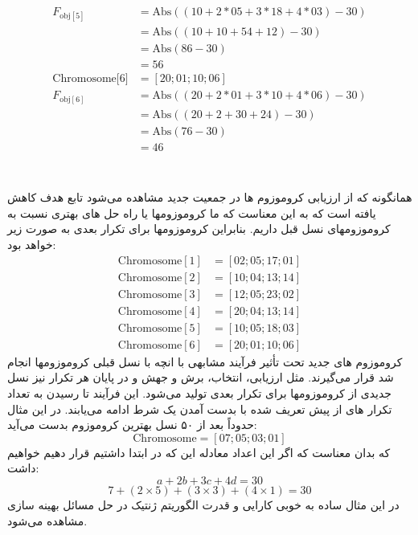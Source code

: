 \documentclass[11pt]{article}
\begin{document}
\[\begin{array}{ll}
F_{\text{obj}[5]} & = \text{Abs}\left((10 + 2*05 + 3*18 + 4*03) - 30\right) \\
& = \text{Abs}\left((10 + 10 + 54 + 12) - 30\right) \\
& = \text{Abs}(86 - 30) \\
& = 56 \\
\text{Chromosome[6]} & = [20;01;10;06] \\
F_{\text{obj}[6]} & = \text{Abs}\left((20 + 2*01 + 3*10 + 4*06) - 30\right) \\
& = \text{Abs}\left((20 + 2 + 30 + 24) - 30\right) \\
& = \text{Abs}(76 - 30) \\
& = 46 \\
\end{array}
\]
\\
\\

همانگونه که از ارزیابی کروموزوم ها در جمعیت جدید مشاهده می‌شود تابع هدف کاهش یافته است که به این معناست که ما کروموزومها یا راه حل های بهتری نسبت به کروموزومهای نسل قبل داریم. بنابراین کروموزومها برای تکرار بعدی به صورت زیر خواهد بود:
\[
\begin{array}{ll}
\text{Chromosome}[1] & = [02;05;17;01] \\
\text{Chromosome}[2] & = [10;04;13;14] \\
\text{Chromosome}[3] & = [12;05;23;02] \\
\text{Chromosome}[4] & = [20;04;13;14] \\
\text{Chromosome}[5] & = [10;05;18;03] \\
\text{Chromosome}[6] & = [20;01;10;06]
\end{array}
\]
کروموزوم های جدید تحت تأثیر فرآیند مشابهی با انچه با نسل قبلی کروموزومها انجام شد قرار می‌گیرند. مثل ارزیابی، انتخاب، برش و جهش و  در پایان هر تکرار نیز نسل جدیدی از کروموزومها برای تکرار بعدی تولید می‌شود. این فرآیند تا رسیدن به تعداد تکرار های از پیش تعریف شده با بدست آمدن یک شرط ادامه می‌یابند. در این مثال حدوداً بعد از ۵۰ نسل بهترین کروموزوم بدست می‌آید:
\[
\text{Chromosome} = [07; 05; 03; 01]
\]
که بدان معناست که اگر این اعداد معادله این که در ابتدا داشتیم قرار دهیم خواهیم داشت:
\[ a + 2b + 3c + 4d = 30 \]
\[ 7 + (2 \times 5) + (3 \times 3) + (4 \times 1) = 30 \]
در این مثال ساده به خوبی کارایی و قدرت الگوریتم ژنتیک در حل مسائل بهینه سازی مشاهده می‌شود.
\end{document}
